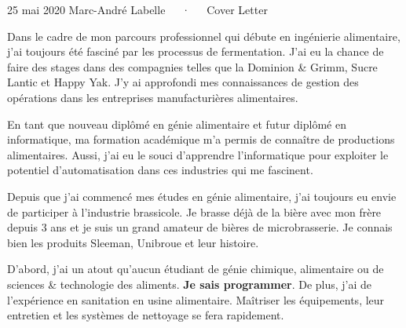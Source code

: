 \documentclass[french, letterpaper]{marckit-cv}
\begin{document}
\makecvheader[R]

\makecvfooter
  {25 mai 2020}
  {Marc-André Labelle~~~·~~~Cover Letter}         %
  {}

\makelettertitle

\begin{cvletter}

    Dans le cadre de mon parcours professionnel qui débute
    en ingénierie alimentaire, j'ai toujours été
    fasciné par les processus de fermentation.
    J’ai eu la chance de faire des stages dans des compagnies
    telles que la Dominion \& Grimm, Sucre Lantic et Happy Yak.
    J’y ai approfondi mes connaissances de gestion des opérations dans
    les entreprises manufacturières alimentaires.

    En tant que nouveau diplômé en génie alimentaire et futur diplômé
    en informatique, ma formation académique m’a permis de connaître
    de productions alimentaires.
    Aussi, j'ai eu le souci d'apprendre l'informatique pour exploiter
    le potentiel d'automatisation dans ces industries qui me fascinent.

    Depuis que j'ai commencé mes études en génie alimentaire, j'ai toujours
    eu envie de participer à l'industrie brassicole.
    Je brasse déjà de la bière avec mon frère depuis 3 ans et je suis
    un grand amateur de bières de microbrasserie.
    Je connais bien les produits Sleeman, Unibroue et leur histoire.

    D'abord, j'ai un atout qu'aucun étudiant de génie chimique, alimentaire ou
    de sciences \& technologie des aliments. \textbf{Je sais programmer}.
    De plus, j'ai de l'expérience en sanitation en usine alimentaire.
    Maîtriser les équipements, leur entretien et les systèmes de nettoyage
    se fera rapidement.

\end{cvletter}


\makeletterclosing
\end{document}
